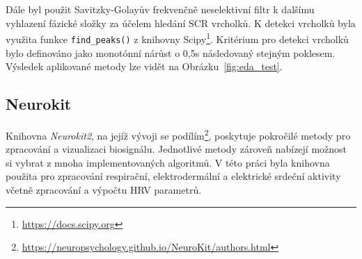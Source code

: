 Dále byl použit Savitzky-Golayův frekvenčně neselektivní filtr k dalšímu
vyhlazení fázické složky za účelem hledání \gls{SCR} vrcholků. K detekci
vrcholků byla využita funkce \texttt{find\_peaks()} z knihovny
Scipy\footnote{\url{https://docs.scipy.org}}. Kritérium pro detekci vrcholků
bylo definováno jako monotónní nárůst o 0,5s následovaný stejným poklesem.
Výsledek aplikované metody lze vidět na Obrázku~\ref{fig:eda_test}.

\subsection*{Neurokit}
\label{subsec:neurokit}
Knihovna \textit{Neurokit2}, na jejíž vývoji se
podílím\footnote{\url{https://neuropsychology.github.io/NeuroKit/authors.html}},
poskytuje pokročilé metody pro zpracování a vizualizaci biosignálu. Jednotlivé
metody zároveň nabízejí možnost si vybrat z mnoha implementovaných algoritmů. V
této práci byla knihovna použita pro zpracování respirační, elektrodermální a
elektrické srdeční aktivity včetně zpracování a výpočtu \gls{HRV} parametrů.
